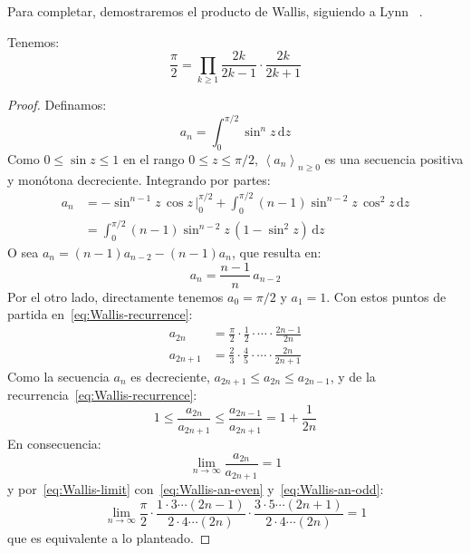   Para completar,
  demostraremos el producto de Wallis,
  siguiendo a Lynn~%
    \cite{lynn:_wallis_product}.
  \begin{theorem}
    \label{theo:producto-Wallis}
    Tenemos:
    \begin{equation*}
      \frac{\pi}{2}
	= \prod_{k \ge 1}
	    \frac{2 k}{2 k - 1} \cdot \frac{2 k}{2 k + 1}
    \end{equation*}
  \end{theorem}
  \begin{proof}
    Definamos:
    \begin{equation*}
      a_n
	= \int_0^{\pi / 2} \sin^n z \, \mathrm{d} z
    \end{equation*}
    Como \(0 \le \sin z \le 1\) en el rango \(0 \le z \le \pi / 2\),
      \(\left\langle a_n \right\rangle_{n \ge 0}\)
    es una secuencia positiva y monótona decreciente.
    Integrando por partes:
    \begin{align*}
      a_n
	&= -\sin^{n - 1} z \, \cos z \,
	   \biggr|_0^{\pi / 2}
	   + \int_0^{\pi / 2}
	       (n - 1) \sin^{n - 2} z \, \cos^2 z \, \mathrm{d} z \\
	&= \int_0^{\pi / 2}
	     (n - 1) \sin^{n - 2} z \, (1 - \sin^2 z)
	     \, \mathrm{d} z
    \end{align*}
    O sea \(a_n = (n - 1) a_{n - 2} - (n - 1) a_n\),
    que resulta en:
    \begin{equation}
      \label{eq:Wallis-recurrence}
      a_n
	= \frac{n - 1}{n} \, a_{n - 2}
    \end{equation}
    Por el otro lado,
    directamente tenemos \(a_0 = \pi / 2\) y \(a_1 = 1\).
    Con estos puntos de partida en~\eqref{eq:Wallis-recurrence}:
    \begin{align}
      a_{2 n}
	&= \frac{\pi}{2} \cdot \frac{1}{2} \cdot \dotsm
	     \cdot \frac{2 n - 1}{2 n} \label{eq:Wallis-an-even} \\
      a_{2 n + 1}
	&= \frac{2}{3} \cdot \frac{4}{5} \cdot \dotsm
	     \cdot \frac{2 n}{2 n + 1} \label{eq:Wallis-an-odd}
    \end{align}
    Como la secuencia \(a_n\) es decreciente,
    \(a_{2 n + 1} \le a_{2 n} \le a_{2 n - 1}\),
    y de la recurrencia~\eqref{eq:Wallis-recurrence}:
    \begin{equation*}
      1 \le \frac{a_{2 n}}{a_{2 n + 1}}
	\le \frac{a_{2 n - 1}}{a_{2 n + 1}}
	= 1 + \frac{1}{2 n}
    \end{equation*}
    En consecuencia:
    \begin{equation}
      \label{eq:Wallis-limit}
      \lim_{n \rightarrow \infty} \frac{a_{2 n}}{a_{2 n + 1}}
	= 1
    \end{equation}
    y por~\eqref{eq:Wallis-limit}
    con~\eqref{eq:Wallis-an-even} y~\eqref{eq:Wallis-an-odd}:
    \begin{equation*}
      \lim_{n \rightarrow \infty}
	\frac{\pi}{2} \cdot
	  \frac{1 \cdot 3 \dotsm (2 n - 1)}
	       {2 \cdot 4 \dotsm (2 n)} \cdot
	  \frac{3 \cdot 5 \dotsm (2 n + 1)}
	       {2 \cdot 4 \dotsm (2 n)}
	= 1
    \end{equation*}
    que es equivalente a lo planteado.
  \end{proof}
